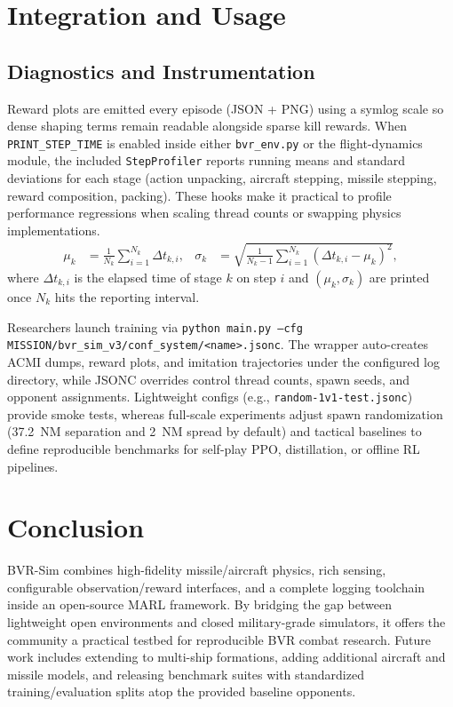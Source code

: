 \documentclass[11pt]{article}
\begin{document}
\section{Integration and Usage}
\subsection{Diagnostics and Instrumentation}
Reward plots are emitted every episode (JSON + PNG) using a symlog scale so dense shaping terms remain readable alongside sparse kill rewards. When \texttt{PRINT\_STEP\_TIME} is enabled inside either \texttt{bvr\_env.py} or the flight-dynamics module, the included \texttt{StepProfiler} reports running means and standard deviations for each stage (action unpacking, aircraft stepping, missile stepping, reward composition, packing). These hooks make it practical to profile performance regressions when scaling thread counts or swapping physics implementations.
\begin{align}
\mu_k &= \frac{1}{N_k}\sum_{i=1}^{N_k} \Delta t_{k,i},&
\sigma_k &= \sqrt{\frac{1}{N_k-1}\sum_{i=1}^{N_k} \left(\Delta t_{k,i}-\mu_k\right)^2}, \label{eq:profiler}
\end{align}
where $\Delta t_{k,i}$ is the elapsed time of stage $k$ on step $i$ and $(\mu_k,\sigma_k)$ are printed once $N_k$ hits the reporting interval.

Researchers launch training via \texttt{python main.py --cfg MISSION/bvr\_sim\_v3/conf\_system/<name>.jsonc}. The wrapper auto-creates ACMI dumps, reward plots, and imitation trajectories under the configured log directory, while JSONC overrides control thread counts, spawn seeds, and opponent assignments. Lightweight configs (e.g., \texttt{random-1v1-test.jsonc}) provide smoke tests, whereas full-scale experiments adjust spawn randomization (37.2~NM separation and 2~NM spread by default) and tactical baselines to define reproducible benchmarks for self-play PPO, distillation, or offline RL pipelines.

\section{Conclusion}
BVR-Sim combines high-fidelity missile/aircraft physics, rich sensing, configurable observation/reward interfaces, and a complete logging toolchain inside an open-source MARL framework. By bridging the gap between lightweight open environments and closed military-grade simulators, it offers the community a practical testbed for reproducible BVR combat research. Future work includes extending to multi-ship formations, adding additional aircraft and missile models, and releasing benchmark suites with standardized training/evaluation splits atop the provided baseline opponents.
\end{document}
